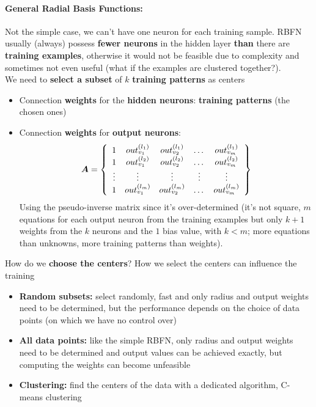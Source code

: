 \paragraph{General Radial Basis Functions:} Not the simple case, we can't have one neuron for each training sample. RBFN usually (always) possess \textbf{fewer neurons} in the hidden layer \textbf{than} there are \textbf{training examples}, otherwise it would not be feasible due to complexity and sometimes not even useful (what if the examples are clustered together?).\\

We need to \textbf{select a subset} of $k$ \textbf{training patterns} as centers
\begin{itemize}
	\item Connection \textbf{weights} for the \textbf{hidden neurons}: \textbf{training patterns} (the chosen ones)
	\item Connection \textbf{weights} for \textbf{output neurons}:
	$$ \bm{A} = \left\{
	\begin{array}{c c c c c}
		1 & out_{v_1}^{(l_1)} & out_{v_2}^{(l_1)} & \dots & out_{v_m}^{(l_1)} \\
		1 & out_{v_1}^{(l_2)} & out_{v_2}^{(l_2)} & \dots & out_{v_m}^{(l_2)} \\
		\vdots & \vdots & \vdots & \vdots & \vdots \\
		1 & out_{v_1}^{(l_m)} & out_{v_2}^{(l_m)} & \dots & out_{v_m}^{(l_m)} \\
	\end{array}
	\right\}$$
	Using the pseudo-inverse matrix since it's over-determined (it's not square, $m$ equations for each output neuron from the training examples but only $k+1$ weights from the $k$ neurons and the $1$ bias value, with $k < m$; more equations than unknowns, more training patterns than weights).
\end{itemize}

How do we \textbf{choose the centers}? How we select the centers can influence the training
\begin{itemize}
	\item \textbf{Random subsets:} select randomly, fast and only radius and output weights need to be determined, but the performance depends on the choice of data points (on which we have no control over)
	\item \textbf{All data points:} like the simple RBFN, only radius and output weights need to be determined and output values can be achieved exactly, but computing the weights can become unfeasible 
	\item \textbf{Clustering:} find the centers of the data with a dedicated algorithm, C-means clustering
\end{itemize}

